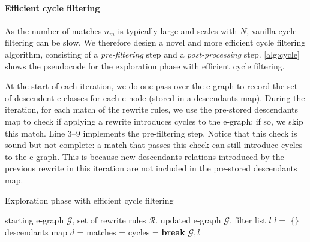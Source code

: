 \paragraph{Efficient cycle filtering}

As the number of matches $n_m$ is typically large and scales with $N$, vanilla cycle filtering can be slow.
We therefore design a novel and more efficient cycle filtering algorithm, consisting of a \textit{pre-filtering} step and a \textit{post-processing} step.
\autoref{alg:cycle} shows the pseudocode for the exploration phase with efficient cycle filtering.

At the start of each iteration, we do one pass over the e-graph to record the set of descendent e-classes for each e-node (stored in a descendants map).
During the iteration, for each match of the rewrite rules, we use the pre-stored descendants map to check if  applying a rewrite introduces cycles to the e-graph; if so, we skip this match.
Line 3--9 implements the pre-filtering step.
Notice that this check is sound but not complete: a match that passes this check can still introduce cycles to the e-graph.
This is because new descendants relations introduced by the previous rewrite in this iteration are not included in the pre-stored descendants map.

\begin{algorithm}[t]
\small
\caption{Exploration phase with efficient cycle filtering}
\label{alg:cycle}
\begin{algorithmic}[1]
\Require starting e-graph $\mathcal{G}$, set of rewrite rules $\mathcal{R}$.
\Ensure updated e-graph $\mathcal{G}$, filter list $l$
  \State $l = $ $\{\}$
    \State descendants map $d$ = 
    \State matches = 
        \State {}
      \EndIf
    \EndFor
      \State cycles = 
        \State \textbf{break}
      \EndIf
        \State {}
      \EndFor
    \EndWhile
  \EndFor
  \State \Return $\mathcal{G}, l$
\end{algorithmic}
\end{algorithm}

